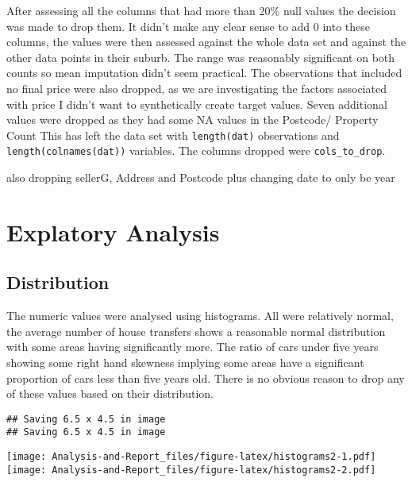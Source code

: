 \documentclass[
]{article}
\begin{document}
After assessing all the columns that had more than 20\% null values the
decision was made to drop them. It didn't make any clear sense to add 0
into these columns, the values were then assessed against the whole data
set and against the other data points in their suburb. The range was
reasonably significant on both counts so mean imputation didn't seem
practical. The observations that included no final price were also
dropped, as we are investigating the factors associated with price I
didn't want to synthetically create target values. Seven additional
values were dropped as they had some NA values in the Postcode/ Property
Count This has left the data set with \texttt{length(dat)} observations
and \texttt{length(colnames(dat))} variables. The columns dropped were
\texttt{cols\_to\_drop}.

also dropping sellerG, Address and Postcode plus changing date to only
be year

\hypertarget{explatory-analysis}{%
\section{Explatory Analysis}\label{explatory-analysis}}

\hypertarget{distribution}{%
\subsection{Distribution}\label{distribution}}

The numeric values were analysed using histograms. All were relatively
normal, the average number of house transfers shows a reasonable normal
distribution with some areas having significantly more. The ratio of
cars under five years showing some right hand skewness implying some
areas have a significant proportion of cars less than five years old.
There is no obvious reason to drop any of these values based on their
distribution.

\begin{verbatim}
## Saving 6.5 x 4.5 in image
## Saving 6.5 x 4.5 in image
\end{verbatim}

\texttt{[image: Analysis-and-Report\_files/figure-latex/histograms2-1.pdf]}
\texttt{[image: Analysis-and-Report\_files/figure-latex/histograms2-2.pdf]}
\end{document}

